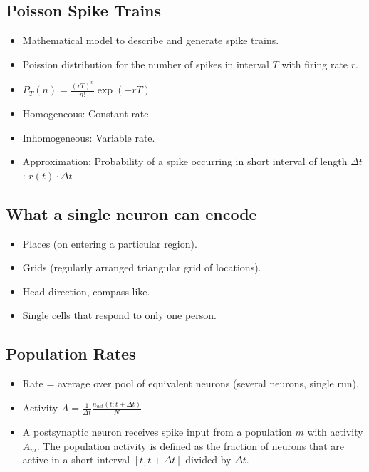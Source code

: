 \documentclass[main]{subfiles}
\begin{document}
\subsection{Poisson Spike Trains}
\begin{itemize}[noitemsep,nolistsep]
	\item Mathematical model to describe and generate spike trains.
	\item Poission distribution for the number of spikes in interval $T$ with firing rate $r$.
	\item $P_T(n)=\frac{(rT)^n}{n!}\exp(-rT)$
	\item Homogeneous: Constant rate.
	\item Inhomogeneous: Variable rate.
	\item Approximation: Probability of a spike occurring in short interval of length $\Delta t$: $r(t)\cdot\Delta t$
\end{itemize}

\subsection{What a single neuron can encode}
\begin{itemize}[noitemsep,nolistsep]
	\item Places (on entering a particular region).
	\item Grids (regularly arranged triangular grid of locations).
	\item Head-direction, compass-like.
	\item Single cells that respond to only one person.
\end{itemize}

\subsection{Population Rates}
\begin{itemize}[noitemsep,nolistsep]
	\item Rate = average over pool of equivalent neurons (several neurons, single run).
	\item Activity $A=\frac{1}{\Delta t}\frac{n_{act}(t;t+\Delta t)}{N}$
	\item A postsynaptic neuron receives spike input from a population $m$ with activity $A_m$. The population activity is defined as the fraction of neurons that are active in a short interval $[t,t+\Delta t]$ divided by $\Delta t$.
\end{itemize}
\end{document}
